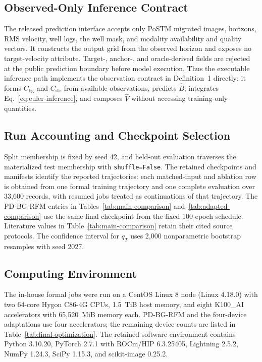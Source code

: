 \subsection{Observed-Only Inference Contract}
The released prediction interface accepts only PoSTM migrated images, horizons, RMS velocity, well logs, the well mask, and modality availability and quality vectors. It constructs the output grid from the observed horizon and exposes no target-velocity attribute. Target-, anchor-, and oracle-derived fields are rejected at the public prediction boundary before model execution. Thus the executable inference path implements the observation contract in Definition~1 directly: it forms $C_{\mathrm{bg}}$ and $C_{\mathrm{str}}$ from available observations, predicts $\hat B$, integrates Eq.~\ref{eq:euler-inference}, and composes $\hat V$ without accessing training-only quantities.

\subsection{Run Accounting and Checkpoint Selection}
Split membership is fixed by seed 42, and held-out evaluation traverses the materialized test membership with \texttt{shuffle=False}. The retained checkpoints and manifests identify the reported trajectories: each matched-input and ablation row is obtained from one formal training trajectory and one complete evaluation over 33,600 records, with resumed jobs treated as continuations of that trajectory. The PD-BG-RFM entries in Tables~\ref{tab:main-comparison} and~\ref{tab:adapted-comparison} use the same final checkpoint from the fixed 100-epoch schedule. Literature values in Table~\ref{tab:main-comparison} retain their cited source protocols. The confidence interval for $q_T$ uses 2,000 nonparametric bootstrap resamples with seed 2027.

\subsection{Computing Environment}
The in-house formal jobs were run on a CentOS Linux 8 node (Linux 4.18.0) with two 64-core Hygon C86-4G CPUs, 1.5~TiB host memory, and eight K100\_AI accelerators with 65,520~MiB memory each. PD-BG-RFM and the four-device adaptations use four accelerators; the remaining device counts are listed in Table~\ref{tab:final-optimization}. The retained software environment contains Python 3.10.20, PyTorch 2.7.1 with ROCm/HIP 6.3.25405, Lightning 2.5.2, NumPy 1.24.3, SciPy 1.15.3, and scikit-image 0.25.2.

